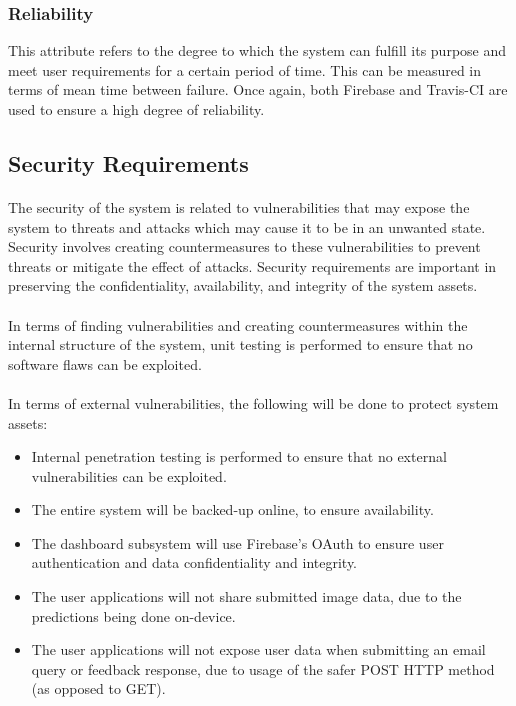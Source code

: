 \documentclass[a4paper, 11pt]{article}
\begin{document}
        \subsubsection{Reliability}
        This attribute refers to the degree to which the system can fulfill its purpose and meet user requirements for a certain period of time. This can be measured in terms of mean time between failure. Once again, both Firebase and Travis-CI are used to ensure a high degree of reliability.
        
    \subsection{Security Requirements}
        \paragraph{}
        The security of the system is related to vulnerabilities that may expose the system to threats and attacks which may cause it to be in an unwanted state. Security involves creating countermeasures to these vulnerabilities to prevent threats or mitigate the effect of attacks. Security requirements are important in preserving the confidentiality, availability, and integrity of the system assets.
        \paragraph{}
        In terms of finding vulnerabilities and creating countermeasures within the internal structure of the system, unit testing is performed to ensure that no software flaws can be exploited.
        \paragraph{}
        In terms of external vulnerabilities, the following will be done to protect system assets:
        \begin{itemize}
            \item Internal penetration testing is performed to ensure that no external vulnerabilities can be exploited.
            \item The entire system will be backed-up online, to ensure availability.
            \item The dashboard subsystem will use Firebase's OAuth to ensure user authentication and data confidentiality and integrity.
            \item The user applications will not share submitted image data, due to the predictions being done on-device.
            \item The user applications will not expose user data when submitting an email query or feedback response, due to usage of the safer POST HTTP method (as opposed to GET).
        \end{itemize}
        
\end{document}
